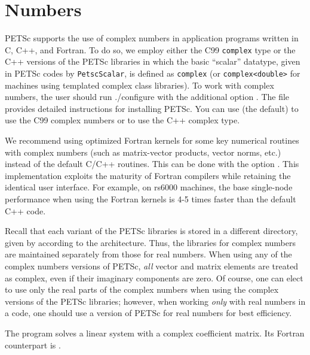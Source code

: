 {{\section{Numbers}  \label{sec_complex}

PETSc supports the use of complex numbers in application programs
written in C, C++, and Fortran.  To do so, we employ either the C99 \lstinline{complex} type or the C++ versions of
the PETSc libraries in which the basic ``scalar'' datatype, given in
PETSc codes by \lstinline{PetscScalar}, is defined as \lstinline{complex} (or \lstinline{complex<double>}
 for machines using templated complex class
libraries).  To work with complex numbers,
the user should run ./configure with the additional option .
The file \href{https://www.mcs.anl.gov/petsc/documentation/installation.html}{}
provides detailed instructions for installing PETSc. 
You can use  (the default) to use the C99 complex numbers or  to use the C++ complex type. 

We recommend using optimized Fortran kernels for some key numerical
routines with complex numbers (such as matrix-vector products, vector
norms, etc.) instead of the default C/C++ routines.  This can be done with the   option .
This implementation exploits the
maturity of Fortran compilers while retaining the identical user
interface.  For example, on rs6000 machines, the base single-node
performance when using the Fortran kernels is 4-5 times faster than
the default C++ code.


Recall that each variant of the PETSc libraries is stored in a
different directory, given by
according to the architecture. Thus, the
libraries for complex
numbers are maintained separately from those for real
numbers.  When using any of the complex numbers versions of PETSc,
{\em all} vector and matrix elements are treated as complex,
even if their imaginary components are zero.
Of course, one can elect to use only the real parts of the complex
numbers when using the complex versions of the PETSc libraries;
however, when working {\em only} with real numbers in a code,
one should use a version of PETSc for real numbers for best efficiency.

The program \href{http://www.mcs.anl.gov/petsc/petsc-current/src/ksp/ksp/examples/tutorials/ex11.c.html}{}
solves a linear system with a complex
coefficient matrix.  Its Fortran counterpart is
\href{http://www.mcs.anl.gov/petsc/petsc-current/src/ksp/ksp/examples/tutorials/ex11f.F.html}{}.

}}
